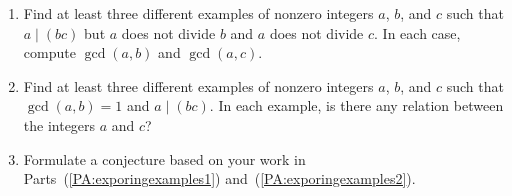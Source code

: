 \begin{previewactivity}\label{PA:exporingexamples} \hfill
\begin {enumerate}
\item Find at least three different examples of nonzero integers  $a$, $b$, and  $c$  such that  
$a \mid \left( {bc} \right)$ but  $a$  does not divide  $b$  and  $a$  does not divide  $c$.  In  each case, compute  $\gcd( {a, b} )$  and  $\gcd( {a, c} )$.
\label{PA:exporingexamples1}%

\item Find at least three different examples of nonzero integers  $a$, $b$, and  $c$  such that %
$\gcd( {a, b} ) = 1$  and  $a \mid ( {bc} )$.  In each example, is there any relation between the integers  $a$  and  $c$? 
\label{PA:exporingexamples2}%

\item Formulate a conjecture based on your work in Parts~(\ref{PA:exporingexamples1}) and~(\ref{PA:exporingexamples2}).

\end{enumerate}
%
\end{previewactivity}
\hbreak
%


\endinput
